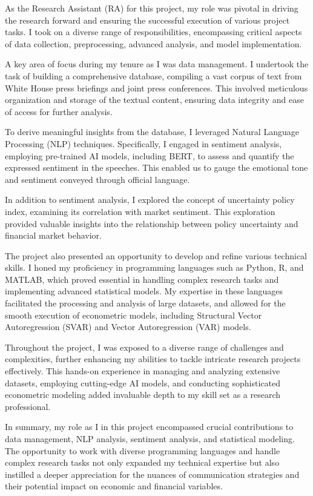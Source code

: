 \documentclass{article}
\begin{document}
As the Research Assistant (RA) for this project, my role was pivotal in driving the research forward and ensuring the successful execution of various project tasks. I took on a diverse range of responsibilities, encompassing critical aspects of data collection, preprocessing, advanced analysis, and model implementation.
\par
A key area of focus during my tenure as I was data management. I undertook the task of building a comprehensive database, compiling a vast corpus of text from White House press briefings and joint press conferences. This involved meticulous organization and storage of the textual content, ensuring data integrity and ease of access for further analysis.
\par
To derive meaningful insights from the database, I leveraged Natural Language Processing (NLP) techniques. Specifically, I engaged in sentiment analysis, employing pre-trained AI models, including BERT, to assess and quantify the expressed sentiment in the speeches. This enabled us to gauge the emotional tone and sentiment conveyed through official language.
\par
In addition to sentiment analysis, I explored the concept of uncertainty policy index, examining its correlation with market sentiment. This exploration provided valuable insights into the relationship between policy uncertainty and financial market behavior.
\par
The project also presented an opportunity to develop and refine various technical skills. I honed my proficiency in programming languages such as Python, R, and MATLAB, which proved essential in handling complex research tasks and implementing advanced statistical models. My expertise in these languages facilitated the processing and analysis of large datasets, and allowed for the smooth execution of econometric models, including Structural Vector Autoregression (SVAR) and Vector Autoregression (VAR) models.
\par
Throughout the project, I was exposed to a diverse range of challenges and complexities, further enhancing my abilities to tackle intricate research projects effectively. This hands-on experience in managing and analyzing extensive datasets, employing cutting-edge AI models, and conducting sophisticated econometric modeling added invaluable depth to my skill set as a research professional.
\par
In summary, my role as I in this project encompassed crucial contributions to data management, NLP analysis, sentiment analysis, and statistical modeling. The opportunity to work with diverse programming languages and handle complex research tasks not only expanded my technical expertise but also instilled a deeper appreciation for the nuances of communication strategies and their potential impact on economic and financial variables.
\end{document}
